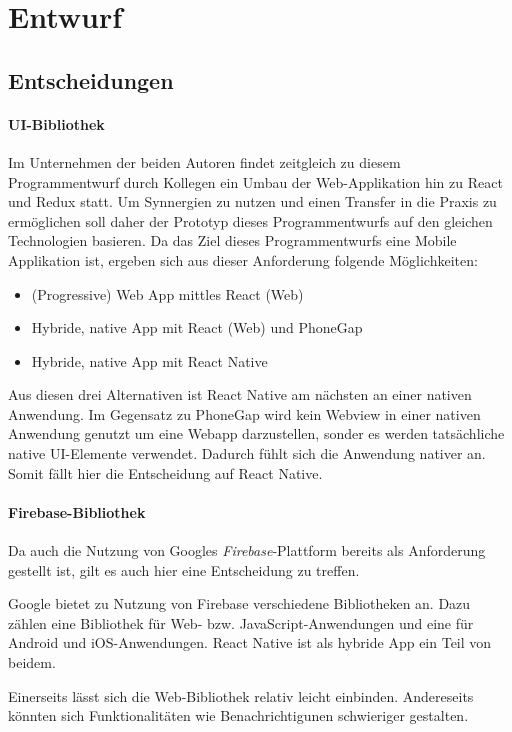 \section{Entwurf}\label{sec:entwurf}

\subsection{Entscheidungen}
\paragraph{UI-Bibliothek}
Im Unternehmen der beiden Autoren findet zeitgleich zu diesem Programmentwurf durch Kollegen ein Umbau der Web-Applikation hin zu React und Redux statt.
Um Synnergien zu nutzen und einen Transfer in die Praxis zu ermöglichen soll daher der Prototyp dieses Programmentwurfs auf den gleichen Technologien basieren.
Da das Ziel dieses Programmentwurfs eine Mobile Applikation ist, ergeben sich aus dieser Anforderung folgende Möglichkeiten:
\begin{itemize}
    \item (Progressive) Web App mittles React (Web)
    \item Hybride, native App mit React (Web) und PhoneGap
    \item Hybride, native App mit React Native
\end{itemize}

Aus diesen drei Alternativen ist React Native am nächsten an einer nativen Anwendung.
Im Gegensatz zu PhoneGap wird kein Webview in einer nativen Anwendung genutzt um eine Webapp darzustellen,
sonder es werden tatsächliche native UI-Elemente verwendet.
Dadurch fühlt sich die Anwendung nativer an.
Somit fällt hier die Entscheidung auf React Native.

\paragraph{Firebase-Bibliothek}
Da auch die Nutzung von Googles \textit{Firebase}-Plattform bereits als Anforderung gestellt ist,
gilt es auch hier eine Entscheidung zu treffen.

Google bietet zu Nutzung von Firebase verschiedene Bibliotheken an.
Dazu zählen eine Bibliothek für Web- bzw. JavaScript-Anwendungen und eine für Android und iOS-Anwendungen.
React Native ist als hybride App ein Teil von beidem.

Einerseits lässt sich die Web-Bibliothek relativ leicht einbinden.
Andereseits könnten sich Funktionalitäten wie Benachrichtigunen schwieriger gestalten.

